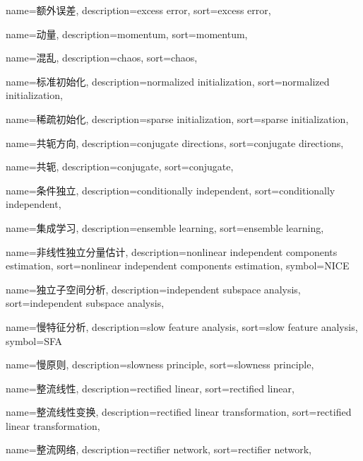 {
  name=额外误差,
  description={excess error},
  sort={excess error},
}

{
  name=动量,
  description={momentum},
  sort={momentum},
}

{
  name=混乱,
  description={chaos},
  sort={chaos},
}

{
  name=标准初始化,
  description={normalized initialization},
  sort={normalized initialization},
}

{
  name=稀疏初始化,
  description={sparse initialization},
  sort={sparse initialization},
}

{
  name=共轭方向,
  description={conjugate directions},
  sort={conjugate directions},
}

{
  name=共轭,
  description={conjugate},
  sort={conjugate},
}

{
  name=条件独立,
  description={conditionally independent},
  sort={conditionally independent},
}

{
  name=集成学习,
  description={ensemble learning},
  sort={ensemble learning},
}

{
  name=非线性独立分量估计,
  description={nonlinear independent components estimation},
  sort={nonlinear independent components estimation},
  symbol={NICE}
}

{
  name=独立子空间分析,
  description={independent subspace analysis},
  sort={independent subspace analysis},
}

{
  name=慢特征分析,
  description={slow feature analysis},
  sort={slow feature analysis},
  symbol={SFA}
}

{
  name=慢原则,
  description={slowness principle},
  sort={slowness principle},
}

{
  name=整流线性,
  description={rectified linear},
  sort={rectified linear},
}

{
  name=整流线性变换,
  description={rectified linear transformation},
  sort={rectified linear transformation},
}

{
  name=整流网络,
  description={rectifier network},
  sort={rectifier network},
}

